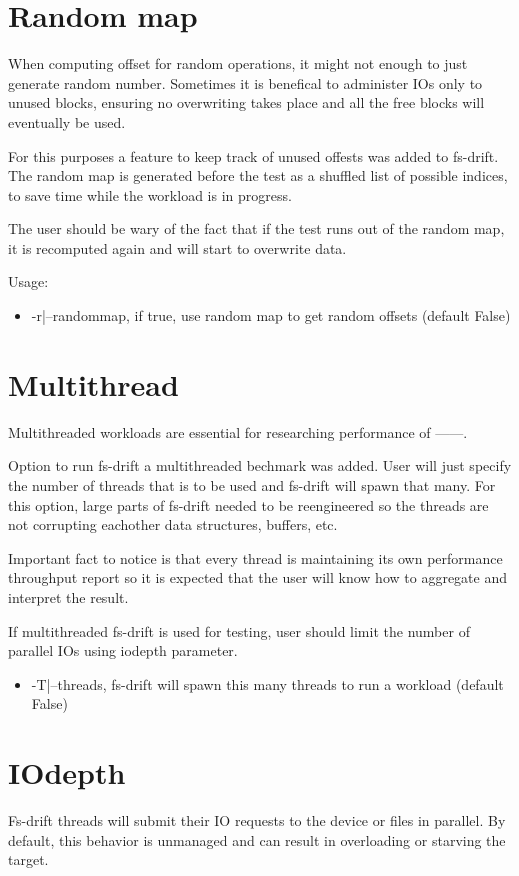 \documentclass[
  color, %
  table, %
  lof,   %
  lot,   %
]{fithesis3}
\begin{document}
\section{Random map}
When computing offset for random operations, it might not enough to just generate random number. Sometimes it is benefical to administer IOs only to unused blocks, ensuring no overwriting takes place and all the free blocks will eventually be used.

For this purposes a feature to keep track of unused offests was added to fs-drift. The random map is generated before the test as a shuffled list of possible indices, to save time while the workload is in progress.

The user should be wary of the fact that if the test runs out of the random map, it is recomputed again and will start to overwrite data.

Usage:
\begin{itemize}
    \item -r|--randommap, if true, use random map to get random offsets (default False)
\end{itemize}

\section{Multithread}
Multithreaded workloads are essential for researching performance of ------.

Option to run fs-drift a multithreaded bechmark was added. User will just specify the number of threads that is to be used and fs-drift will spawn that many. For this option, large parts of fs-drift needed to be reengineered so the threads are not corrupting eachother data structures, buffers, etc.

Important fact to notice is that every thread is maintaining its own performance throughput report so it is expected that the user will know how to aggregate and interpret the result.

If multithreaded fs-drift is used for testing, user should limit the number of parallel IOs using iodepth parameter.


\begin{itemize}
    \item -T|--threads, fs-drift will spawn this many threads to run a workload (default False)
\end{itemize}

\section{IOdepth}
Fs-drift threads will submit their IO requests to the device or files in parallel. By default, this behavior is unmanaged and can result in overloading or starving the target.
\end{document}

